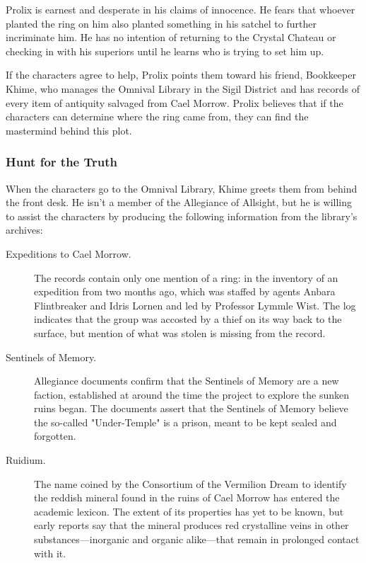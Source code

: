 \documentclass[letterpaper, 11pt, bg=full, twocolumn]{dndbook}
\begin{document}
Prolix is earnest and desperate in his claims of innocence. He fears that whoever planted the ring on him also planted something in his satchel to further incriminate him. He has no intention of returning to the Crystal Chateau or checking in with his superiors until he learns who is trying to set him up.

If the characters agree to help, Prolix points them toward his friend, Bookkeeper Khime, who manages the Omnival Library in the Sigil District and has records of every item of antiquity salvaged from Cael Morrow. Prolix believes that if the characters can determine where the ring came from, they can find the mastermind behind this plot.

\subsubsection{Hunt for the Truth}

When the characters go to the Omnival Library, Khime greets them from behind the front desk. He isn't a member of the Allegiance of Allsight, but he is willing to assist the characters by producing the following information from the library's archives:


\begin{description}
\item[Expeditions to Cael Morrow.] The records contain only one mention of a ring: in the inventory of an expedition from two months ago, which was staffed by agents Anbara Flintbreaker and Idris Lornen and led by Professor Lymmle Wist. The log indicates that the group was accosted by a thief on its way back to the surface, but mention of what was stolen is missing from the record.
\item[Sentinels of Memory.] Allegiance documents confirm that the Sentinels of Memory are a new faction, established at around the time the project to explore the sunken ruins began. The documents assert that the Sentinels of Memory believe the so-called "Under-Temple" is a prison, meant to be kept sealed and forgotten.
\item[Ruidium.] The name coined by the Consortium of the Vermilion Dream to identify the reddish mineral found in the ruins of Cael Morrow has entered the academic lexicon. The extent of its properties has yet to be known, but early reports say that the mineral produces red crystalline veins in other substances---inorganic and organic alike---that remain in prolonged contact with it.
\end{description}
\end{document}
